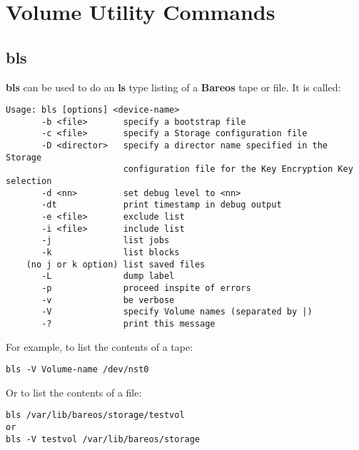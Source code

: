 \section{Volume Utility Commands}


\subsection{bls}
\label{bls}

{\bf bls} can be used to do an {\bf ls} type listing of a {\bf Bareos} tape or
file. It is called:

\footnotesize
\begin{verbatim}
Usage: bls [options] <device-name>
       -b <file>       specify a bootstrap file
       -c <file>       specify a Storage configuration file
       -D <director>   specify a director name specified in the Storage
                       configuration file for the Key Encryption Key selection
       -d <nn>         set debug level to <nn>
       -dt             print timestamp in debug output
       -e <file>       exclude list
       -i <file>       include list
       -j              list jobs
       -k              list blocks
    (no j or k option) list saved files
       -L              dump label
       -p              proceed inspite of errors
       -v              be verbose
       -V              specify Volume names (separated by |)
       -?              print this message
\end{verbatim}
\normalsize

For example, to list the contents of a tape:

\footnotesize
\begin{verbatim}
bls -V Volume-name /dev/nst0
\end{verbatim}
\normalsize

Or to list the contents of a file:

\footnotesize
\begin{verbatim}
bls /var/lib/bareos/storage/testvol
or
bls -V testvol /var/lib/bareos/storage
\end{verbatim}
\normalsize

